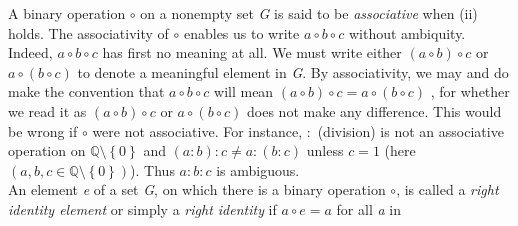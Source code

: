 \documentclass[11pt]{amsbook}
\begin{document}
	A binary operation $\circ$ on a nonempty set \textit{G} is said to be \textit{associative} when (ii) holds. The associativity of $\circ$ enables us to write $a\circ b\circ c$ without ambiquity. Indeed, $a\circ b \circ c$ has first no meaning at all. We must write either $(a\circ b)\circ c$ or $a\circ (b\circ c)$ to denote a meaningful element in \textit{G}. By associativity, we may and do make the convention that $a\circ b \circ c$ will mean $(a\circ b)\circ c = a\circ (b\circ c)$ , for whether we read it as $(a\circ b)\circ c$ or $a\circ (b\circ c)$ does not make any difference. This would be wrong if $\circ$ were not associative. For instance, $:$ (division) is not an associative operation on $\mathbb{Q}\setminus\left \{ 0 \right \}$ and $(a:b):c \neq a:(b:c)$ unless $c=1$ (here $\left ( a, b, c \in  \mathbb{Q}\setminus\left \{ 0 \right \}\right )$). Thus $a:b:c$ is ambiguous.
	\\
	
	An element \textit{e} of a set \textit{G}, on which there is a binary operation $\circ$, is called a \textit{right identity element} or simply a \textit{right identity} if $a\circ e = a$ for all \textit{a} in 
	
\end{document}
